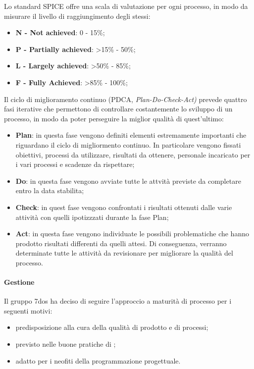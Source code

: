 	Lo standard SPICE offre una scala di valutazione per ogni processo, in modo da misurare il livello di raggiungimento degli stessi:
	\begin{itemize}
	\item \textbf{N - Not achieved}: 0 - 15\%;
	\item \textbf{P - Partially achieved}: >15\% - 50\%;
	\item \textbf{L - Largely achieved}: >50\% - 85\%;
	\item \textbf{F - Fully Achieved}: >85\% - 100\%;
	\end{itemize}

	Il ciclo di miglioramento continuo (PDCA, \emph{Plan-Do-Check-Act)} prevede quattro fasi iterative che permettono di controllare costantemente lo sviluppo di un processo, in modo da poter perseguire la miglior qualità di quest'ultimo:
	\begin{itemize}
	\item \textbf{Plan}: in questa fase vengono definiti elementi estremamente importanti che riguardano il ciclo di migliormento continuo. In particolare vengono fissati obiettivi, processi da utilizzare, risultati da ottenere, personale incaricato per i vari processi e scadenze da rispettare;
	\item \textbf{Do}: in questa fase vengono avviate tutte le attvità previste da completare entro la data stabilita;
	\item \textbf{Check}: in quest fase vengono confrontati i risultati ottenuti dalle varie attività con quelli ipotizzzati durante la fase Plan;
	\item \textbf{Act}: in questa fase vengono individuate le possibili problematiche che hanno prodotto risultati differenti da quelli attesi. Di conseguenza, verranno determinate tutte le attività da revisionare per migliorare la qualità del processo. 
	\end{itemize}

\paragraph{Gestione}
	Il gruppo 7dos ha deciso di seguire l'approccio a maturità di processo per i seguenti motivi:
	\begin{itemize}
	\item predisposizione alla cura della qualità di prodotto e di processi;
	\item previsto nelle buone pratiche di ;
	\item adatto per i neofiti della programmazione progettuale.
	\end{itemize}
	
